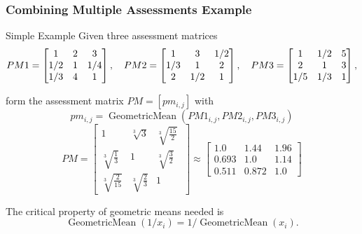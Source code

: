 \documentclass[10pt,handout,hyperref={colorlinks=true,linkcolor=blue,citecolor=citelink,urlcolor=gray}]{beamer}
\newcounter{e_temp}
\begin{document}
\begin{frame}
\frametitle{Combining Multiple Assessments Example}
\vspace{-1ex}
{\small
\begin{block}{Simple Example}
Given three assessment matrices 
\vspace{-1ex}
\[	PM1 = \begin{bmatrix} 1&2&3 \\ 1/2&1&1/4 \\ 1/3&4&1 \end{bmatrix}, 
	\quad PM2 = \begin{bmatrix} 1&3&1/2 \\ 1/3&1&2 \\ 2&1/2&1 \end{bmatrix},
	\quad PM3 = \begin{bmatrix} 1&1/2&5 \\ 2&1&3 \\ 1/5&1/3&1 \end{bmatrix},
	\vspace{-1ex}	\]
\pause

form the assessment matrix $PM=[pm_{i,j}]$ with 
\[	pm_{i,j}=\operatorname{GeometricMean}(PM1_{i,j},PM2_{i,j},PM3_{i,j})	\]
\[	PM = \begin{bmatrix} 1&\sqrt[3]{3}& \sqrt[3]{\frac{15}{2}}\; \\[0.75ex]
		\sqrt[3]{\frac{1}{3}} &1& \sqrt[3]{\frac{3}{2}} \\[0.75ex] 
		\sqrt[3]{\frac{2}{15}} & \sqrt[3]{\frac{2}{3}} &1 \end{bmatrix} 
	\approx \begin{bmatrix} 1.0& 1.44& 1.96 \\ 0.693& 1.0& 1.14 \\ 0.511 & 0.872& 1.0 \end{bmatrix}	\]
\pause
\vspace{2ex}

The critical property of geometric means needed is
\vspace{-1ex}
\[	\operatorname{GeometricMean}(1/x_i) = 1/ \operatorname{GeometricMean}(x_i).	\]
\end{block}
}
\end{frame}
\end{document}
